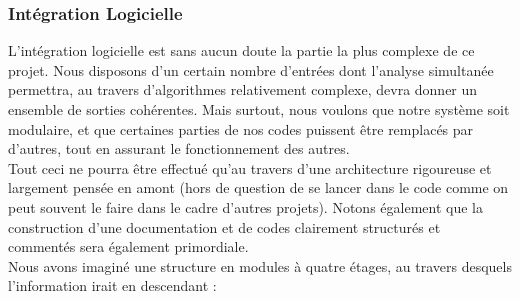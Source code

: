 	\subsubsection{Intégration Logicielle}\label{integrationLogicielle}

		L'intégration logicielle est sans aucun doute la partie la plus complexe de ce projet. Nous disposons d'un certain nombre d'entrées dont l'analyse simultanée permettra, au travers d'algorithmes relativement complexe, devra donner un ensemble de sorties cohérentes. Mais surtout, nous voulons que notre système soit modulaire, et que certaines parties de nos codes puissent être remplacés par d'autres, tout en assurant le fonctionnement des autres.\\

		Tout ceci ne pourra être effectué qu'au travers d'une architecture rigoureuse et largement pensée en amont (hors de question de se lancer dans le code comme on peut souvent le faire dans le cadre d'autres projets). Notons également que la construction d'une documentation et de codes clairement structurés et commentés sera également primordiale.\\

		Nous avons imaginé une structure en modules à quatre étages, au travers desquels l'information irait en descendant :

